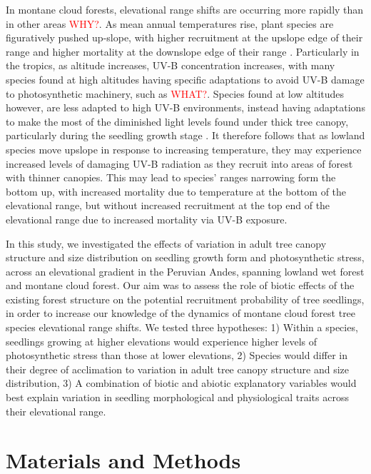 \documentclass[a4paper,11pt]{article}
\newcommand{\todo}[1]{\textcolor{red}{#1}}   %
\begin{document}
In montane cloud forests, elevational range shifts are occurring more rapidly than in other areas \citep{} \todo{WHY?}. As mean annual temperatures rise, plant species are figuratively pushed up-slope, with higher recruitment at the upslope edge of their range and higher mortality at the downslope edge of their range \citep{}. Particularly in the tropics, as altitude increases, UV-B concentration increases, with many species found at high altitudes \citep{} having specific adaptations to avoid UV-B damage to photosynthetic machinery, such as \todo{WHAT?}. Species found at low altitudes however, are less adapted to high UV-B environments, instead having adaptations to make the most of the diminished light levels found under thick tree canopy, particularly during the seedling growth stage \citep{}. It therefore follows that as lowland species move upslope in response to increasing temperature, they may experience increased levels of damaging UV-B radiation as they recruit into areas of forest with thinner canopies. This may lead to species' ranges narrowing form the bottom up, with increased mortality due to temperature at the bottom of the elevational range, but without increased recruitment at the top end of the elevational range due to increased mortality via UV-B exposure.

In this study, we investigated the effects of variation in adult tree canopy structure and size distribution on seedling growth form and photosynthetic stress, across an elevational gradient in the Peruvian Andes, spanning lowland wet forest and montane cloud forest. Our aim was to assess the role of biotic effects of the existing forest structure on the potential recruitment probability of tree seedlings, in order to increase our knowledge of the dynamics of montane cloud forest tree species elevational range shifts. We tested three hypotheses: 1) Within a species, seedlings growing at higher elevations would experience higher levels of photosynthetic stress than those at lower elevations, 2) Species would differ in their degree of acclimation to variation in adult tree canopy structure and size distribution, 3) A combination of biotic and abiotic explanatory variables would best explain variation in seedling morphological and physiological traits across their elevational range.  

\section{Materials and Methods}
\end{document}
